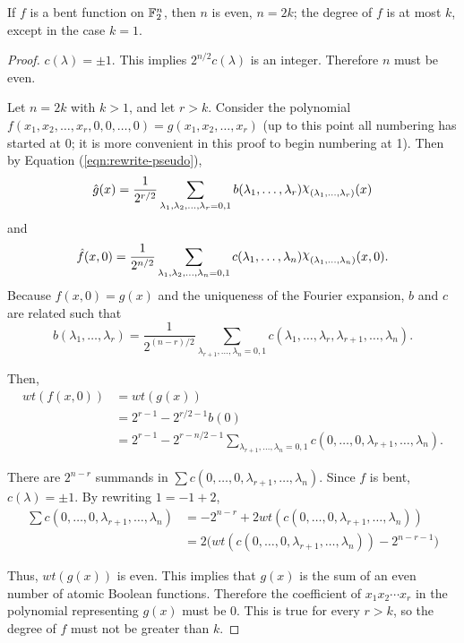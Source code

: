\begin{theorem}\label{thm:deg-of-bent-function}
	If $f$ is a bent function on $\mathbb{F}_2^n$, then $n$ is even, $n=2k$;
	the degree of $f$ is at most $k$, except in the case $k=1$.
\end{theorem}
\begin{proof}
  \par $c(\lambda)=\pm1$. This implies $2^{n/2}c(\lambda)$ is an
  integer. Therefore $n$ must be even.
  \par Let $n=2k$ with $k>1$, and let $r>k$. Consider the polynomial
  $f(x_1,x_2,\allowbreak\dots,\allowbreak x_r,\allowbreak 0,0,\dots,0)=
  \allowbreak g(x_1,x_2,\dots,x_r)$ (up to this point all numbering has
  started at 0; it is more convenient in this proof to begin numbering at
  1). Then by Equation (\ref{eqn:rewrite-pseudo}),
  \[
  \hat{g}(x)=\frac{1}{2^{r/2}}\sum_{\lambda_1,\lambda_2,\dots,\lambda_r=0,1}
    b(\lambda_1,\dots,\lambda_r)\Chi_{(\lambda_1,\ldots,\lambda_r)}(x)
  \]
  and
  \[
	\hat{f}(x,0)=\frac{1}{2^{n/2}}
    \sum_{\lambda_1,\lambda_2,\dots,\lambda_n=0,1}
    c(\lambda_1,\dots,\lambda_n)\Chi_{(\lambda_1,\ldots,\lambda_n)}(x,0).
  \]
  Because $f(x,0)=g(x)$ and the uniqueness of the Fourier expansion, $b$ and
  $c$ are related such that
  \[
  b(\lambda_1,\dots,\lambda_r)
    =\frac{1}{2^{(n-r)/2}}\sum_{\lambda_{r+1},\dots,\lambda_n=0,1}
    c(\lambda_1,\dots,\lambda_r,\lambda_{r+1},\dots,\lambda_n).
  \]
  \par Then,
  \begin{align*}
  wt(f(x,0))&=wt(g(x))\\
    &=2^{r-1}-2^{r/2-1}b(0)\\
    &=2^{r-1}-2^{r-n/2-1}\sum_{\lambda_{r+1},\dots,\lambda_n=0,1}
      c(0,\dots,0,\lambda_{r+1},\dots,\lambda_n).
  \end{align*}
  \par There are $2^{n-r}$ summands in
  $\sum{c(0,\dots,0,\lambda_{r+1},\dots,\lambda_n)}.$ Since $f$ is bent,
  $c(\lambda)=\pm1$. By rewriting $1=-1+2$,
  \begin{align*}
    \sum{c(0,\dots,0,\lambda_{r+1},\dots,\lambda_n)}
      &=-2^{n-r}+2wt(c(0,\dots,0,\lambda_{r+1},\dots,\lambda_n))\\
      &=2\big(wt(c(0,\dots,0,\lambda_{r+1},\dots,\lambda_n))-2^{n-r-1}\big)
  \end{align*}
  \par Thus, $wt(g(x))$ is even. This implies that $g(x)$ is the sum of an
  even number of atomic Boolean functions. Therefore the coefficient of
  $x_1x_2\cdots x_r$ in the polynomial representing $g(x)$ must be 0. This
  is true for every $r>k$, so the degree of $f$ must not be greater than
  $k$.
\end{proof}

